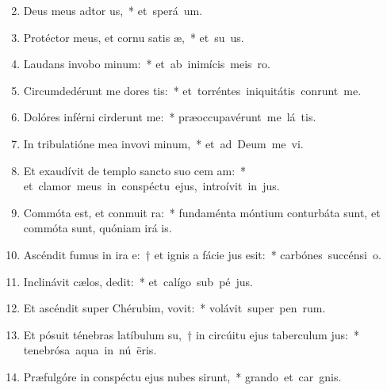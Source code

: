 \begin{flushleft}
\begin{enumerate}[leftmargin=*]
\setcounter{enumi}{1}

\item Deus meus adtor us,~* \mbox{et sperá  um.}
\item Protéctor meus, et cornu satis æ,~* \mbox{et su us.}
\item Laudans invobo minum:~* \mbox{et ab inimícis meis  ro.}
\item Circumdedérunt me dores tis:~* \mbox{et torréntes iniquitátis conrunt me.}
\item Dolóres inférni cirderunt me:~* \mbox{præoccupavérunt me lá tis.}
\item In tribulatióne mea invovi minum,~* \mbox{et ad Deum me vi.}
\item Et exaudívit de templo sancto suo cem am:~* \mbox{et clamor meus in conspéctu ejus, introívit in  jus.}
\item Commóta est, et conmuit ra:~* fundaménta móntium conturbáta sunt, et commóta sunt, quóniam irá  is.
\item Ascéndit fumus in ira e:~† et ignis a fácie jus esit:~* \mbox{carbónes succénsi   o.}
\item Inclinávit cælos,  dedit:~* \mbox{et calígo sub pé jus.}
\item Et ascéndit super Chérubim,  vovit:~* \mbox{volávit super pen rum.}
\item Et pósuit ténebras latíbulum su,~† in circúitu ejus taberculum jus:~* \mbox{tenebrósa aqua in nú ëris.}
\item Præfulgóre in conspéctu ejus nubes sirunt,~* \mbox{grando et car gnis.}

\end{enumerate}
\end{flushleft}
